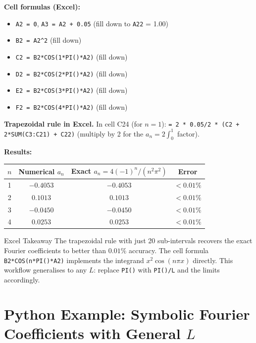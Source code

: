 \documentclass[12pt,a4paper]{article}
\begin{document}
\noindent\textbf{Cell formulas (Excel):}
\begin{itemize}
  \item \texttt{A2 = 0}, \texttt{A3 = A2 + 0.05} (fill down to \texttt{A22} = 1.00)
  \item \texttt{B2 = A2\^{}2} (fill down)
  \item \texttt{C2 = B2*COS(1*PI()*A2)} (fill down) \quad [for $n=1$]
  \item \texttt{D2 = B2*COS(2*PI()*A2)} (fill down) \quad [for $n=2$]
  \item \texttt{E2 = B2*COS(3*PI()*A2)} (fill down) \quad [for $n=3$]
  \item \texttt{F2 = B2*COS(4*PI()*A2)} (fill down) \quad [for $n=4$]
\end{itemize}

\noindent\textbf{Trapezoidal rule in Excel.}
In cell C24 (for $n=1$): \texttt{= 2 * 0.05/2 * (C2 + 2*SUM(C3:C21) + C22)}
(multiply by 2 for the $a_n = 2\int_0^1$ factor).

\noindent\textbf{Results:}
\begin{center}
\begin{tabular}{cccc}
\toprule
$n$ & Numerical $a_n$ & Exact $a_n = 4(-1)^n/(n^2\pi^2)$ & Error \\
\midrule
1 & $-0.4053$ & $-0.4053$ & $< 0.01\%$ \\
2 & $0.1013$ & $0.1013$ & $< 0.01\%$ \\
3 & $-0.0450$ & $-0.0450$ & $< 0.01\%$ \\
4 & $0.0253$ & $0.0253$ & $< 0.01\%$ \\
\bottomrule
\end{tabular}
\end{center}

\begin{learnbox}{Excel Takeaway}
The trapezoidal rule with just 20 sub-intervals recovers the exact Fourier coefficients to better than $0.01\%$ accuracy.
The cell formula \texttt{B2*COS(n*PI()*A2)} implements the integrand $x^2\cos(n\pi x)$ directly.
This workflow generalises to any $L$: replace \texttt{PI()} with \texttt{PI()/L} and the limits accordingly.
\end{learnbox}

\section{Python Example: Symbolic Fourier Coefficients with General $L$}
\end{document}
